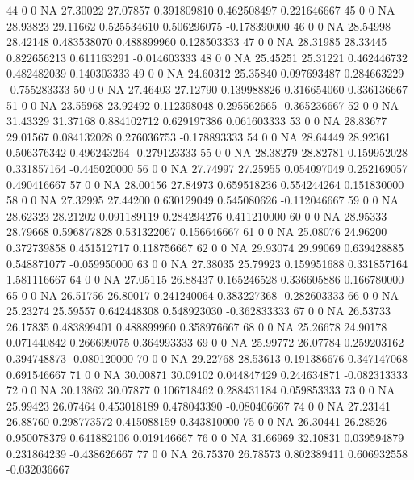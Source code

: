 \documentclass{beamer}
\begin{document}
\begin{frame}[fragile]
\begin{itemize}
\begin{Schunk}
\begin{Soutput}
44       0       0 NA 27.30022 27.07857 0.391809810 0.462508497  0.221646667
45       0       0 NA 28.93823 29.11662 0.525534610 0.506296075 -0.178390000
46       0       0 NA 28.54998 28.42148 0.483538070 0.488899960  0.128503333
47       0       0 NA 28.31985 28.33445 0.822656213 0.611163291 -0.014603333
48       0       0 NA 25.45251 25.31221 0.462446732 0.482482039  0.140303333
49       0       0 NA 24.60312 25.35840 0.097693487 0.284663229 -0.755283333
50       0       0 NA 27.46403 27.12790 0.139988826 0.316654060  0.336136667
51       0       0 NA 23.55968 23.92492 0.112398048 0.295562665 -0.365236667
52       0       0 NA 31.43329 31.37168 0.884102712 0.629197386  0.061603333
53       0       0 NA 28.83677 29.01567 0.084132028 0.276036753 -0.178893333
54       0       0 NA 28.64449 28.92361 0.506376342 0.496243264 -0.279123333
55       0       0 NA 28.38279 28.82781 0.159952028 0.331857164 -0.445020000
56       0       0 NA 27.74997 27.25955 0.054097049 0.252169057  0.490416667
57       0       0 NA 28.00156 27.84973 0.659518236 0.554244264  0.151830000
58       0       0 NA 27.32995 27.44200 0.630129049 0.545080626 -0.112046667
59       0       0 NA 28.62323 28.21202 0.091189119 0.284294276  0.411210000
60       0       0 NA 28.95333 28.79668 0.596877828 0.531322067  0.156646667
61       0       0 NA 25.08076 24.96200 0.372739858 0.451512717  0.118756667
62       0       0 NA 29.93074 29.99069 0.639428885 0.548871077 -0.059950000
63       0       0 NA 27.38035 25.79923 0.159951688 0.331857164  1.581116667
64       0       0 NA 27.05115 26.88437 0.165246528 0.336605886  0.166780000
65       0       0 NA 26.51756 26.80017 0.241240064 0.383227368 -0.282603333
66       0       0 NA 25.23274 25.59557 0.642448308 0.548923030 -0.362833333
67       0       0 NA 26.53733 26.17835 0.483899401 0.488899960  0.358976667
68       0       0 NA 25.26678 24.90178 0.071440842 0.266699075  0.364993333
69       0       0 NA 25.99772 26.07784 0.259203162 0.394748873 -0.080120000
70       0       0 NA 29.22768 28.53613 0.191386676 0.347147068  0.691546667
71       0       0 NA 30.00871 30.09102 0.044847429 0.244634871 -0.082313333
72       0       0 NA 30.13862 30.07877 0.106718462 0.288431184  0.059853333
73       0       0 NA 25.99423 26.07464 0.453018189 0.478043390 -0.080406667
74       0       0 NA 27.23141 26.88760 0.298773572 0.415088159  0.343810000
75       0       0 NA 26.30441 26.28526 0.950078379 0.641882106  0.019146667
76       0       0 NA 31.66969 32.10831 0.039594879 0.231864239 -0.438626667
77       0       0 NA 26.75370 26.78573 0.802389411 0.606932558 -0.032036667

\end{Soutput}
\end{Schunk}
\end{itemize}
\end{frame}
\end{document}
